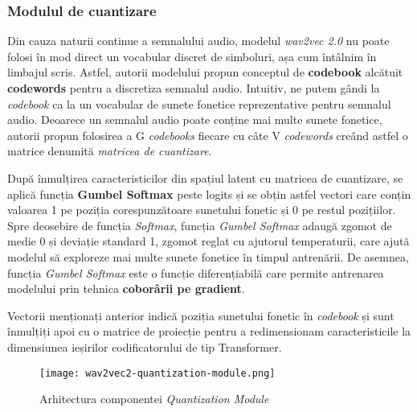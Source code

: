 \subsubsection{Modulul de cuantizare}
\vspace{1em}
Din cauza naturii continue a semnalului audio, modelul \textit{wav2vec 2.0} nu poate folosi în mod direct
un vocabular discret de simboluri, așa cum întâlnim în limbajul scris. Astfel, autorii modelului propun
conceptul de \textbf{codebook} alcătuit \textbf{codewords} pentru a discretiza semnalul audio. Intuitiv,
ne putem gândi la \textit{codebook} ca la un vocabular de sunete fonetice reprezentative pentru semnalul
audio. Deoarece un semnalul audio poate conține mai multe sunete fonetice, autorii propun folosirea
a G \textit{codebooks} fiecare cu câte V \textit{codewords} creând astfel o matrice denumită \textit{matricea
de cuantizare}.
\par
După înmulțirea caracteristicilor din spațiul latent cu matricea de cuantizare, se aplică funcția
\textbf{Gumbel Softmax} peste logits și se obțin astfel vectori care conțin valoarea 1 pe poziția
corespunzătoare sunetului fonetic și 0 pe restul pozițiilor. Spre deosebire de funcția \textit{Softmax},
funcția \textit{Gumbel Softmax} adaugă zgomot de medie 0 și deviație standard 1, zgomot reglat cu 
ajutorul temperaturii, care ajută modelul să exploreze mai multe sunete fonetice în timpul antrenării.
De asemnea, funcția \textit{Gumbel Softmax} este o funcție diferențiabilă care permite antrenarea modelului
prin tehnica \textbf{coborârii pe gradient}.
\par
Vectorii menționați anterior indică poziția sunetului fonetic în \textit{codebook} și sunt înmulțiți
apoi cu o matrice de proiecție pentru a redimensionam caracteristicile la dimensiunea ieșirilor
codificatorului de tip Transformer.

\vspace{1.5em}
\begin{figure}[h]
    \centering
    \texttt{[image: wav2vec2-quantization-module.png]}
    \caption{Arhitectura componentei \textit{Quantization Module} \protect\footnotemark[1]}
    \label{fig:wav2vec2-quantization-module}
\end{figure}
\vspace{1em}

